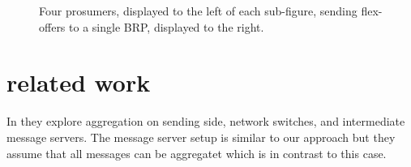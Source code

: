 \documentclass{ifacconf}
\begin{document}
\begin{figure}[]
   \centering
  \caption{Four prosumers, displayed to the left of each sub-figure, sending flex-offers to a single BRP, displayed to the right.}
  \label{fig:communicationservice}
\end{figure}



\section{related work}

In \cite{carmeli} they explore aggregation on sending side, network switches, and intermediate message servers.
The message server setup is similar to our approach but they assume that all messages can be aggregatet which is in contrast to this case.
\end{document}
